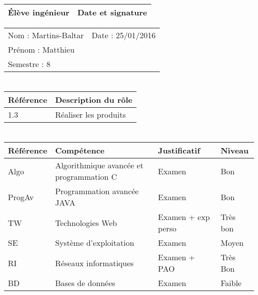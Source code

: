 \documentclass[11pt]{article}
\begin{document}

\begin{center}
\begin{table}[!hp]

	\begin{tabularx}{\linewidth}{|X|X|}
	\hline
	\rowcolor{gray!40} Élève ingénieur & Date et signature \\
	\hline
	\end{tabularx}
	\begin{tabularx}{\linewidth}{|X|X|}
	Nom : Martins-Baltar& Date : 25/01/2016\\ 
	Prénom : Matthieu& \\
	Semestre : 8& \\
	\hline
	\end{tabularx}
\end{table}
\end{center}

\section*{\large\FR}

\begin{table}[!hp]
\centering
	\begin{tabularx}{\linewidth}{|X|X|}
	\hline
	\rowcolor{gray!40} Référence \WBSCourt & Description du rôle \\
	\hline
	 1.3 & Réaliser les produits\\
	 \hline
	\end{tabularx}
\end{table}


\section*{\large\FC}

\begin{table}[!hp]
\centering
	\begin{tabularx}{\linewidth}{|X|X|X|X|}
	\hline
	\rowcolor{gray!40} Référence & Compétence & Justificatif & Niveau \\
	\hline
	 Algo & Algorithmique avancée et programmation C & Examen & Bon\\
	\hline
	 ProgAv & Programmation avancée JAVA & Examen & Bon\\
	\hline
	 TW & Technologies Web & Examen + exp perso & Très bon\\
	\hline
	 SE & Système d'exploitation & Examen & Moyen\\
	\hline
	 RI & Réseaux informatiques & Examen + PAO & Très Bon\\
	\hline
	 BD & Bases de données & Examen & Faible\\
	\hline
	\end{tabularx}
\end{table}
\end{document}
